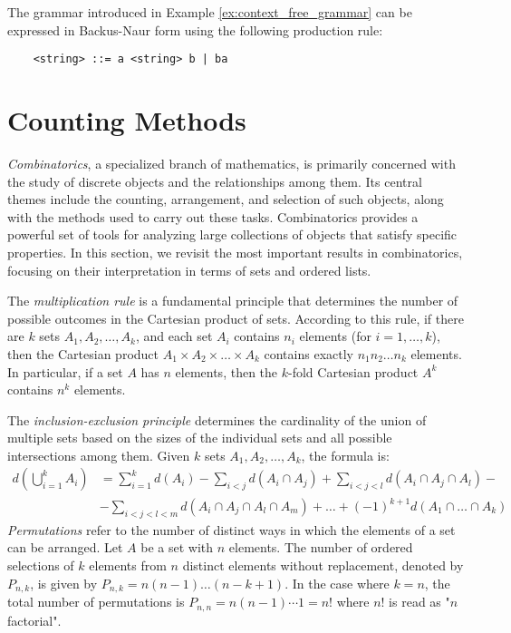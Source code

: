 \begin{example}
The grammar introduced in Example \ref{ex:context_free_grammar} can be expressed in Backus-Naur form using the following production rule:
\begin{verbatim}
    <string> ::= a <string> b | ba
\end{verbatim}
\end{example}

%
%

\section{Counting Methods}
\label{sec:counting}

\emph{Combinatorics}, a specialized branch of mathematics, is primarily concerned with the study of discrete objects and the relationships among them. Its central themes include the counting, arrangement, and selection of such objects, along with the methods used to carry out these tasks. Combinatorics provides a powerful set of tools for analyzing large collections of objects that satisfy specific properties. In this section, we revisit the most important results in combinatorics, focusing on their interpretation in terms of sets and ordered lists.

The \emph{multiplication rule} is a fundamental principle that determines the number of possible outcomes in the Cartesian product of sets. According to this rule, if there are $k$ sets $A_1, A_2, \ldots, A_k$, and each set $A_i$ contains $n_i$ elements (for $i = 1, \ldots, k$), then the Cartesian product $A_1 \times A_2 \times \ldots \times A_k$ contains exactly $n_1 n_2 \ldots n_k$ elements. In particular, if a set $A$ has $n$ elements, then the $k$-fold Cartesian product $A^k$ contains $n^k$ elements.

The \emph{inclusion-exclusion principle} determines the cardinality of the union of multiple sets based on the sizes of the individual sets and all possible intersections among them. Given $k$ sets $A_1, A_2, \ldots, A_k$, the formula is:
\begin{equation*}
\begin{split}
d \left( \bigcup_{i=1}^k A_i \right) & = \sum_{i=1}^k d \left( A_i \right) - \sum_{i<j} d \left( A_i \cap A_j \right) + \sum_{i<j<l} d \left( A_i \cap A_j \cap A_l \right) - \\
& - \sum_{i<j<l<m} d \left( A_i \cap A_j \cap A_l \cap A_m \right) + \ldots +  (-1)^{k+1} d \left( A_1 \cap \ldots \cap A_k \right) 
\end{split}
\end{equation*}
\emph{Permutations} refer to the number of distinct ways in which the elements of a set can be arranged. Let $A$ be a set with $n$ elements. The number of ordered selections of $k$ elements from $n$ distinct elements without replacement, denoted by $P_{n,k}$, is given by $P_{n,k} = n \left( n-1 \right) \ldots \left( n-k+1 \right)$. In the case where $k = n$, the total number of permutations is $P_{n,n} = n \left( n-1 \right) \cdots 1 = n!$ where $n!$ is read as "$n$ factorial".

